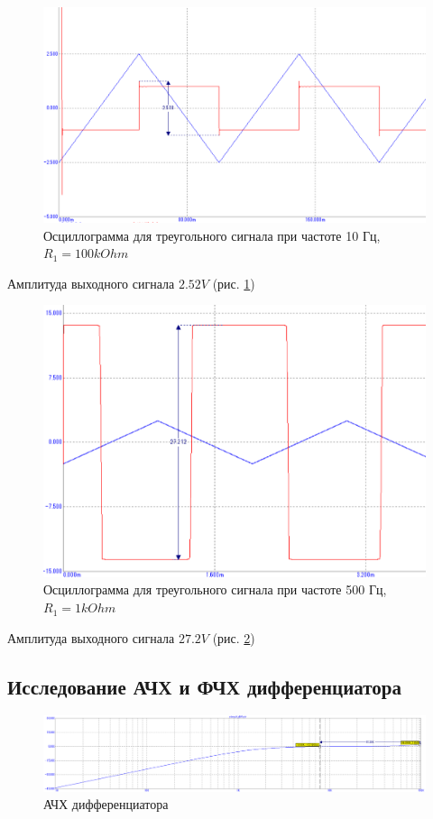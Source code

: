 \documentclass[a4paper,14pt]{article}
\begin{document}
\begin{figure}[H]
	\centering
	\includegraphics[width=0.7\linewidth]{../imgs/tran_triangle_10Hz_diff}
	\caption{Осциллограмма для треугольного сигнала при частоте 10 Гц, $R_1 = 100kOhm$}
	\label{fig:tran_triangle_10Hz_diff}
\end{figure}

Амплитуда выходного сигнала $2.52V$ (рис. \ref{fig:tran_triangle_10Hz_diff})

\begin{figure}[H]
	\centering
	\includegraphics[width=0.7\linewidth]{../imgs/tran_triangle_500Hz_diff}
	\caption{Осциллограмма для треугольного сигнала при частоте 500 Гц, $R_1 = 1kOhm$}
	\label{fig:tran_triangle_500Hz_diff}
\end{figure}

Амплитуда выходного сигнала $27.2V$ (рис. \ref{fig:tran_triangle_500Hz_diff})

\subsection{Исследование АЧХ и ФЧХ дифференциатора}

\begin{figure}[H]
	\centering
	\includegraphics[width=\linewidth]{../imgs/diff_fr}
	\caption{АЧХ дифференциатора}
	\label{fig:diff_fr}
\end{figure}
\end{document}
